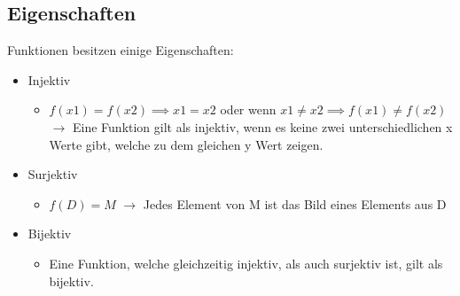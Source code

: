 \documentclass{article}
\begin{document}
	 \subsection{Eigenschaften}
	 Funktionen besitzen einige Eigenschaften:
	 \begin{itemize}
	 	\item{Injektiv}
	 	\begin{itemize}
	 		\item{$f(x1) = f(x2) \implies x1 = x2$ oder wenn $x1 \ne x2 \implies f(x1)\ne f(x2)$ $\to$ Eine Funktion gilt als injektiv, wenn es keine zwei unterschiedlichen x Werte gibt, welche zu dem gleichen y Wert zeigen.}
	 	\end{itemize}
	 	\item{Surjektiv}
	 	\begin{itemize}
	 		\item{$f(D) = M$ $\to$ Jedes Element von M ist das Bild eines Elements aus D}
	 	\end{itemize}
	 	\item{Bijektiv}
	 	\begin{itemize}
	 		\item{Eine Funktion, welche gleichzeitig injektiv, als auch surjektiv ist, gilt als bijektiv.}
	 	\end{itemize}
	 \end{itemize}
\end{document}
